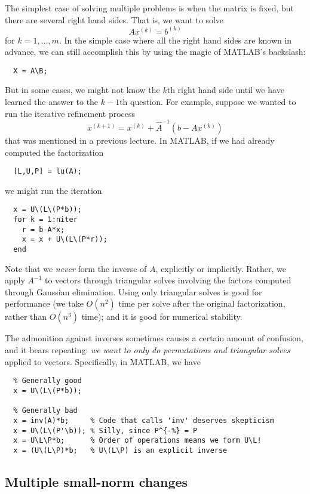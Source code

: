\documentclass[12pt, leqno]{article}
\begin{document}
The simplest case of solving multiple problems is when the matrix
is fixed, but there are several right hand sides.  That is,
we want to solve
\[
  A x^{(k)} = b^{(k)}
\]
for $k = 1, \ldots, m$.  In the simple case where all the right hand
sides are known in advance, we can still accomplish this by using
the magic of MATLAB's backslash:
\begin{lstlisting}
  X = A\B;
\end{lstlisting}
But in some cases, we might not know the $k$th right hand side until
we have learned the answer to the $k-1$th question.  For example,
suppose we wanted to run the iterative refinement process
\[
  x^{(k+1)} = x^{(k)} + \hat{A}^{-1} (b-Ax^{(k)})
\]
that was mentioned in a previous lecture.  In MATLAB, if we had
already computed the factorization
\begin{lstlisting}
  [L,U,P] = lu(A);
\end{lstlisting}
we might run the iteration
\begin{lstlisting}
  x = U\(L\(P*b));
  for k = 1:niter
    r = b-A*x;
    x = x + U\(L\(P*r));
  end
\end{lstlisting}
Note that we {\em never} form the inverse of $A$, explicitly or implicitly.
Rather, we apply $A^{-1}$ to vectors through triangular solves involving
the factors computed through Gaussian elimination.  Using only
triangular solves is good for performance (we take $O(n^2)$ time per
solve after the original factorization, rather than $O(n^3)$ time);
and it is good for numerical stability.

The admonition against inverses sometimes causes a certain amount of
confusion, and it bears repeating: {\em we want to only do
  permutations and triangular solves} applied to vectors.
Specifically, in MATLAB, we have
\begin{lstlisting}
  % Generally good
  x = U\(L\(P*b));

  % Generally bad
  x = inv(A)*b;     % Code that calls 'inv' deserves skepticism
  x = U\(L\(P'\b)); % Silly, since P^{-%} = P
  x = U\L\P*b;      % Order of operations means we form U\L!
  x = (U\(L\P)*b;   % U\(L\P) is an explicit inverse
\end{lstlisting}

\subsection{Multiple small-norm changes}
\end{document}
